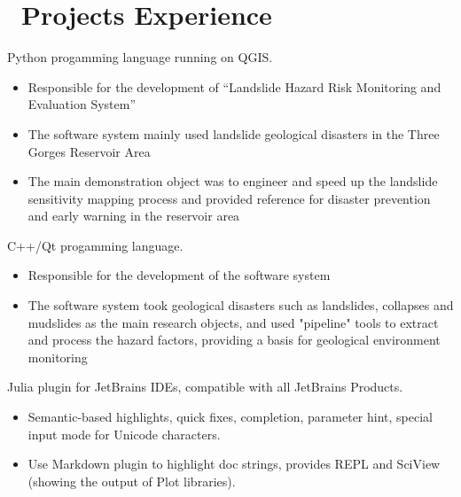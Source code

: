 \documentclass{resume}
\begin{document}
\section{\faGithubAlt\ Projects Experience}


Python progamming language running on QGIS.
\begin{itemize}
  \item Responsible for the development of “Landslide Hazard Risk Monitoring and Evaluation System”
  \item The software system mainly used landslide geological disasters in the Three Gorges Reservoir Area
  \item The main demonstration object was to engineer and speed up the landslide sensitivity mapping process and provided reference for disaster prevention and early warning in the reservoir area
\end{itemize}

C++/Qt progamming language.

\begin{itemize}
  \item Responsible for the development of the software system
  \item The software system took geological disasters such as landslides, collapses and mudslides as the main research objects, and used "pipeline" tools to extract and process the hazard factors, providing a basis for geological environment monitoring
\end{itemize}

Julia plugin for JetBrains IDEs, compatible with all JetBrains Products.
\begin{itemize}
  \item Semantic-based highlights, quick fixes, completion, parameter hint, special input mode for Unicode characters.
  \item Use Markdown plugin to highlight doc strings, provides REPL and SciView (showing the output of Plot libraries).
\end{itemize}

\end{document}
